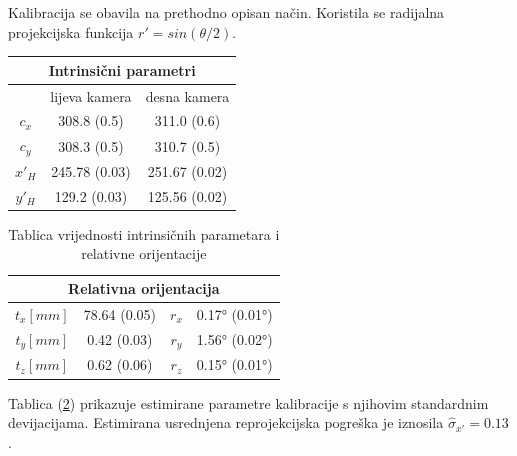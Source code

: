 \documentclass[../seminar.tex]{subfiles}
\begin{document}
Kalibracija se obavila na prethodno opisan način. Koristila se radijalna projekcijska funkcija $r' = sin(\theta / 2)$. 

\begin{table}[h]
\centering
\begin{tabular}{ ccc  }

 \hline
 \multicolumn{3}{c}{Intrinsični parametri} \\
 \hline
 & lijeva kamera & desna kamera\\
 \hline
 $c_x$   & 308.8 (0.5) & 311.0 (0.6)\\
 $c_y$ & 308.3 (0.5) & 310.7 (0.5)\\
 $x'_H$ & 245.78 (0.03) & 251.67 (0.02)\\
 $y'_H$ & 129.2 (0.03) & 125.56 (0.02)\\

 \hline
\end{tabular}
\label{table:table_intrinsic}
\end{table}

\begin{table}[h]
\centering
\begin{tabular}{ cccc  }

 \hline
 \multicolumn{4}{c}{Relativna orijentacija} \\
 \hline
 $t_x [mm]$   & 78.64 (0.05) & $r_x$ & 0.17° (0.01°)\\
 $t_y [mm]$ & 0.42 (0.03) & $r_y$ & 1.56° (0.02°)\\
 $t_z [mm]$ & 0.62 (0.06) & $r_z$ & 0.15° (0.01°)\\
 
\end{tabular}
\caption{Tablica vrijednosti intrinsičnih parametara i relativne orijentacije}
\label{table:table_relative}
\end{table}

Tablica (\ref{table:table_relative}) prikazuje estimirane parametre kalibracije s njihovim standardnim devijacijama. Estimirana usrednjena reprojekcijska pogreška je iznosila $\hat{\sigma}_{x'} = 0.13$.
\end{document}
